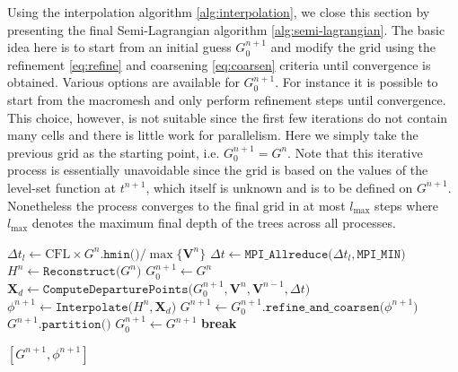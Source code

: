 Using the interpolation algorithm \ref{alg:interpolation}, we close this section by presenting the final Semi-Lagrangian algorithm \ref{alg:semi-lagrangian}. The basic idea here is to start from an initial guess $G^{n+1}_0$ and modify the grid using the refinement \eqref{eq:refine} and coarsening \eqref{eq:coarsen} criteria until convergence is obtained. Various options are available for $G^{n+1}_0$. For instance it is possible to start from the macromesh and only perform refinement steps until convergence. This choice, however, is not suitable since the first few iterations do not contain many cells and there is little work for parallelism. Here we simply take the previous grid as the starting point, i.e. $G^{n+1}_0 = G^n$. Note that this iterative process is essentially unavoidable since the grid is based on the values of the level-set function at $t^{n+1}$, which itself is unknown and is to be defined on $G^{n+1}$. Nonetheless the process converges to the final grid in at most $l_{\max}$ steps  where $l_{\max}$ denotes the maximum final depth of the trees across all processes.
\begin{algorithm}[htbp]
\caption{$[G^{n+1}, \phi^{n+1}] \gets \texttt{SemiLagrangian (}G^n, \phi^n, \mathbf{V}^n, \mathbf{V}^{n-1}, \text{CFL}\texttt{)}$} %
\begin{algorithmic}[1]
\State $\Delta t_l \gets \text{CFL} \times G^n.\texttt{hmin()} / \max \{\mathbf{V}^n \} $
\State $\Delta t   \gets \texttt{MPI\_Allreduce(}\Delta t_l,\texttt{MPI\_MIN)}$
\State $H^n \gets \texttt{Reconstruct(} G^n\texttt{)}$ 
\State $G^{n+1}_0 \gets G^n$
	\State $\mathbf{X}_d  \gets \texttt{ComputeDeparturePoints(}G^{n+1}_0, \mathbf{V}^n, \mathbf{V}^{n-1}, \Delta t\texttt{)}$ 
	\State $\phi^{n+1} \gets \texttt{Interpolate(}H^n, \textbf{X}_d\texttt{)}$
	\State $G^{n+1} \gets G^{n+1}_0.\texttt{refine\_and\_coarsen(}\phi^{n+1}\texttt{)}$ 
		\State $G^{n+1}.\texttt{partition()}$
		\State $G^{n+1}_0 \gets G^{n+1}$
	\Else
		\State \textbf{break}
	\EndIf
\EndWhile

\State \Return $[G^{n+1}, \phi^{n+1}]$
\end{algorithmic}
\label{alg:semi-lagrangian}
\end{algorithm}


